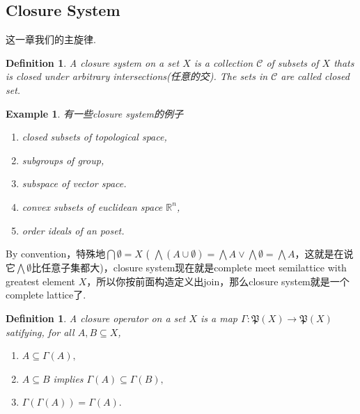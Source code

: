 \documentclass{article}
\newtheorem{example}[theorem]{Example}
\newtheorem{definition}[theorem]{Definition}
\newcommand*{\xfunc}[4]{{#2}\colon{#3}{#1}{#4}}
\newcommand*{\func}[3]{\xfunc{\to}{#1}{#2}{#3}}
\begin{document}
\newpage
\subsection{Closure System}

{\color{blue} 这一章我们的主旋律.
\begin{center}
\end{center}
}
\begin{definition}
\rm A {\color{red} closure system} on a set $X$ is a collection $\mathcal{C}$ of subsets of $X$ thats is closed under arbitrary intersections(任意的交). The sets in $\mathcal{C}$ are called closed set. 
\end{definition}

\begin{example}
\rm 有一些closure system的例子
\begin{enumerate}
	\item closed subsets of topological space,
	\item subgroups of group,
	\item subspace of vector space.
	\item convex subsets of euclidean space $\mathbb{R}^n$,
	\item order ideals of an poset.
\end{enumerate}
\end{example}

{\color{red} By convention，特殊地$\bigcap \emptyset = X$ ( $\bigwedge (A\cup\emptyset) = \bigwedge A \vee \bigwedge \emptyset = \bigwedge A$，这就是在说它$\bigwedge \emptyset$比任意子集都大)，closure system现在就是complete meet semilattice with greatest element $X$，所以你按前面构造定义出join，那么closure system就是一个complete lattice了}.


\begin{definition}
\rm A {\color{red} closure} operator on a set $X$ is a map $\func{\Gamma}{\mathfrak{P}(X)}{\mathfrak{P}(X)}$ satifying, for all $A,B \subseteq X$,
\begin{enumerate}
	\item $A \subseteq \Gamma(A),$
	\item $A \subseteq B$ implies $\Gamma(A) \subseteq \Gamma(B),$
	\item $\Gamma(\Gamma(A)) = \Gamma(A).$
\end{enumerate}
\end{definition}
\end{document}
